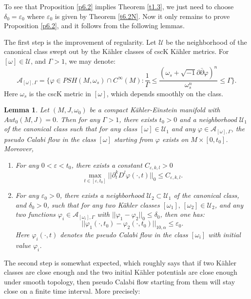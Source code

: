 \documentclass[11pt]{amsart}
\newtheorem{lem}{Lemma}[section]
\numberwithin{equation}{section}
\newcommand \eps{\varepsilon}
\begin{document}
To see that Proposition \ref{p6.2} implies Theorem \ref{t1.3},  we just need to choose $\delta_0=\eps_0$ where $\eps_0$ is given by Theorem \ref{t6.2N}.  Now it only remains to prove Proposition \ref{p6.2},  and it follows from the following lemmas.

The first step is the improvement of regularity.  Let $\mathcal{U}$ be the neighborhood of the canonical class swept out by the K\"ahler classes of cscK K\"ahler metrics.  For $[\omega]\in \mathcal{U}$,  and $\Gamma>1$,  we may denote:
\begin{equation*}
\mathcal{A}_{[\omega],\Gamma}=\{\varphi\in PSH(M,\omega_s)\cap C^{\infty}(M):\frac{1}{\Gamma}\le \frac{(\omega_s+\sqrt{-1}\partial\bar{\partial}\varphi)^n}{\omega_s^n}\le \Gamma\}.
\end{equation*}
Here $\omega_s$ is the cscK metric in $[\omega]$,  which depends smoothly on the class.
\begin{lem}\label{l6.3}
Let $(M,J,\omega_0)$ be a compact K\"ahler-Einstein manifold with $Aut_0(M,J)=0$.  Then for any $\Gamma>1$,  there exists $t_0>0$ and a neighborhood $\mathcal{U}_1$ of the canonical class such that for any class $[\omega]\in \mathcal{U}_1$ and any $\varphi\in \mathcal{A}_{[\omega],\Gamma}$,  the pseudo Calabi flow in the class $[\omega]$ starting from $\varphi$ exists on $M\times [0,t_0]$.  Moreover,  
\begin{enumerate}
\item For any $0<\eps<t_0$,  there exists a constant $C_{\eps,k,l}>0$
\begin{equation*}
\max_{t\in [\eps,t_0]}||\partial_t^kD^l\varphi(\cdot,t)||_0\le C_{\eps,k,l}.
\end{equation*}
\item For any $\eps_0>0$,  there exists a neighborhood $\mathcal{U}_2\subset \mathcal{U}_1$ of the canonical class,  and $\delta_0>0$,  such that for any two K\"ahler classes $[\omega_1],\,[\omega_2]\in \mathcal{U}_2$,  and any two functions $\varphi_i\in \mathcal{A}_{[\omega_i],\Gamma}$ with $||\varphi_1-\varphi_2||_0\le \delta_0$,  then one has:
\begin{equation*}
||\varphi_1(\cdot,t_0)-\varphi_2(\cdot,t_0)||_{10,\alpha}\le \eps_0.
\end{equation*}
Here $\varphi_i(\cdot,t)$ denotes the pseudo Calabi flow in the class $[\omega_i]$ with initial value $\varphi_i$.
\end{enumerate}
\end{lem}
The second step is somewhat expected,  which roughly says that if two K\"ahler classes are close enough and the two initial K\"ahler potentials are close enough under smooth topology,  then pseudo Calabi flow starting from them will stay close on a finite time interval.  More precisely:
\end{document}

